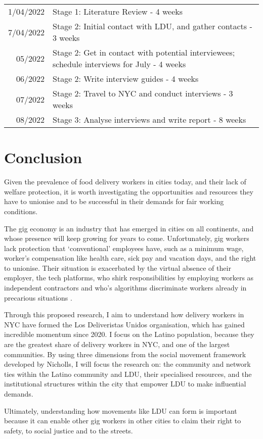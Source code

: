 \documentclass{article}[12pt]
\newcommand{\foo}{\hspace{-2.3pt}$\bullet$ \hspace{5pt}}
\begin{document}
\vspace{10mm}

\begin{tabular}{r |@{\foo} l}
1/04/2022 & Stage 1: Literature Review - 4 weeks\\
7/04/2022 & Stage 2: Initial contact with LDU, and gather contacts - 3 weeks\\
05/2022 & Stage 2: Get in contact with potential interviewees; schedule interviews for July - 4 weeks\\
06/2022 &  Stage 2: Write interview guides - 4 weeks\\
07/2022 & Stage 2: Travel to NYC and conduct interviews - 3 weeks\\
08/2022 & Stage 3: Analyse interviews and write report - 8 weeks\\
\end{tabular}

\vspace{10mm}

\section{Conclusion}

Given the prevalence of food delivery workers in cities today, and their lack of welfare protection, it is worth investigating the opportunities and resources they have to unionise and to be successful in their demands for fair working conditions.

The gig economy is an industry that has emerged in cities on all continents, and whose presence will keep growing for years to come. Unfortunately, gig workers lack protection that `conventional’ employees have, such as a minimum wage, worker’s compensation like health care, sick pay and vacation days, and the right to unionise. Their situation is exacerbated by the virtual absence of their employer, the tech platforms, who shirk responsibilities by employing workers as independent contractors and who’s algorithms discriminate workers already in precarious situations \parencite{kellogg2020algorithms}.

Through this proposed research, I aim to understand how delivery workers in NYC have formed the Los Deliveristas Unidos organisation, which has gained incredible momentum since 2020. I focus on the Latino population, because they are the greatest share of delivery workers in NYC, and one of the largest communities.
By using three dimensions from the social movement framework developed by Nicholls, I will focus the research on: the community and network ties within the Latino community and LDU, their specialised resources, and the institutional structures within the city that empower LDU to make influential demands.

Ultimately, understanding how movements like LDU can form is important because it can enable other gig workers in other cities to claim their right to safety, to social justice and to the streets. 


\printbibliography
\end{document}
